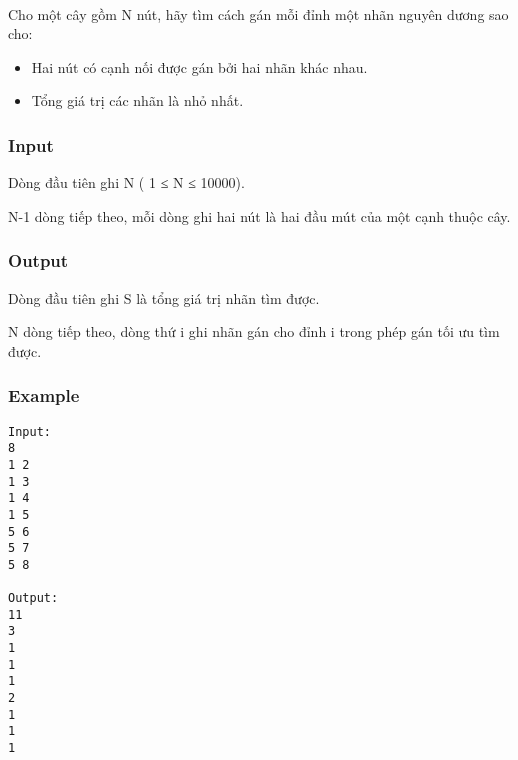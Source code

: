 

 

Cho một cây gồm N nút, hãy tìm cách gán mỗi đỉnh một nhãn nguyên dương sao cho:
\begin{itemize}
	\item Hai nút có cạnh nối được gán bởi hai nhãn khác nhau.
	\item Tổng giá trị các nhãn là nhỏ nhất.
\end{itemize}

\subsubsection{Input}

Dòng đầu tiên ghi N ( 1 ≤ N ≤ 10000).


N-1 dòng tiếp theo, mỗi dòng ghi hai nút là hai đầu mút của một cạnh thuộc cây.

\subsubsection{Output}

Dòng đầu tiên ghi S là tổng giá trị nhãn tìm được.


N dòng tiếp theo, dòng thứ i ghi nhãn gán cho đỉnh i trong phép gán tối ưu tìm được.

\subsubsection{Example}
\begin{verbatim}
Input:
8
1 2
1 3
1 4
1 5
5 6
5 7
5 8

Output:
11
3
1
1
1
2
1
1
1

\end{verbatim}
